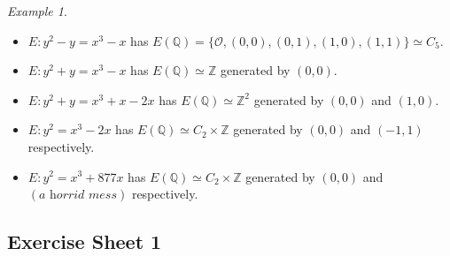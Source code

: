 \documentclass[a4paper]{article}
\theoremstyle{plain}
\theoremstyle{remark}
\newtheorem*{example}{Example}
\theoremstyle{definition}
\renewcommand{\O}{\mathcal{O}}
\newcommand{\Z}{\mathbb{Z}}
\newcommand{\Q}{\mathbb{Q}}
\begin{document}
\begin{example}
    ~
    \begin{itemize}
        \item $E:y^2-y=x^3-x$ has
            $E(\Q)=\{\O,(0,0),(0,1),(1,0),(1,1)\}\simeq C_5$.

        \item $E:y^2+y=x^3-x$ has $E(\Q)\simeq\Z$ generated by $(0,0)$.

        \item $E:y^2+y=x^3+x-2x$ has $E(\Q)\simeq\Z^2$ generated by $(0,0)$ and
            $(1,0)$.

        \item $E:y^2=x^3-2x$ has $E(\Q)\simeq C_2\times\Z$ generated by $(0,0)$
            and $(-1,1)$ respectively.

        \item $E:y^2=x^3+877x$ has $E(\Q)\simeq C_2\times\Z$ generated by $(0,0)$
            and $(\textit{a horrid mess})$ respectively.
    \end{itemize}
\end{example}

\subsection*{Exercise Sheet 1}
\end{document}
